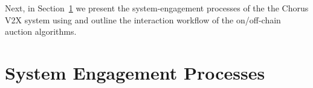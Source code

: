 \documentclass{llncs}
\begin{document}
{%
%		
%		
%		
%		
%		



		
%			

		Next, in Section~\ref{s:section-5} we present the system-engagement processes of the the Chorus V2X system using and outline the interaction workflow of the on/off-chain auction algorithms.


	
	\section{System Engagement Processes}
		\label{s:section-5}	
	
	
}
\end{document}

